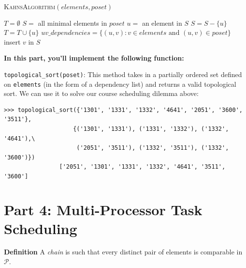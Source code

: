 \documentclass{article}
\begin{document}
    \begin{algorithm}
        \caption{\textsc{KahnsAlgorithm}$(elements, poset)$}\label{alg:cap}
        \label{alg:topological_sort}
        \begin{algorithmic}
            \State $T = \emptyset$
            \State $S = $ all minimal elements in $poset$
                \State $u = $ an element in $S$
                \State $S = S - \{u\}$
                \State $T = T \cup \{u\}$
                \State $uv\_dependencies = \{(u, v) : v \in elements \text{ and }(u, v) \in poset\}$
                     insert $v$ in $S$ \EndIf
                \EndFor

            \EndWhile
            
                
            \State {}
        \end{algorithmic}
    \end{algorithm}


    \vspace{3mm}
    \begin{tcolorbox}[colback=yellow!30]
        \textbf{In this part, you'll implement the following function:}
        
        \lstinline{topological_sort(poset)}: This method takes in a partially ordered set defined on \lstinline{elements} (in the form of a dependency list) and returns a valid topological sort. We can use it to solve our course scheduling dilemma above:

        \begin{lstlisting}[belowskip=-10pt]
            >>> topological_sort({'1301', '1331', '1332', '4641', '2051', '3600', '3511'},
                    {('1301', '1331'), ('1331', '1332'), ('1332', '4641'),\
                     ('2051', '3511'), ('1332', '3511'), ('1332', '3600')})
                ['2051', '1301', '1331', '1332', '4641', '3511', '3600']
        \end{lstlisting}
    \end{tcolorbox}

\section*{Part 4: Multi-Processor Task Scheduling}

    \textbf{Definition} A \textit{chain} is such that every distinct pair of elements is comparable in $\mathcal{P}$.
\end{document}

